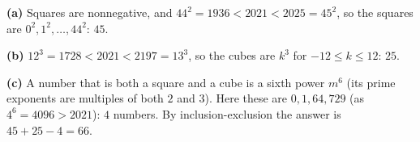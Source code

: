 \textbf{(a)} Squares are nonnegative, and $44^2=1936<2021<2025=45^2$, so the squares are $0^2,1^2,\dots,44^2$: $\boxed{45}$.

\textbf{(b)} $12^3=1728<2021<2197=13^3$, so the cubes are $k^3$ for $-12\le k\le12$: $\boxed{25}$.

\textbf{(c)} A number that is both a square and a cube is a sixth power $m^6$ (its prime exponents are multiples of both $2$ and $3$). Here these are $0,1,64,729$ (as $4^6=4096>2021$): $4$ numbers. By inclusion-exclusion the answer is $45+25-4=\boxed{66}$.
